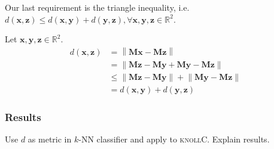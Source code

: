 \documentclass{article}
\newcommand{\vect}[1]{\ensuremath{\boldsymbol{\mathbf{#1}}}\xspace}
\begin{document}
Our last requirement is the triangle inequality, i.e.\ $d(\vect{x},\vect{z}) \leq d(\vect{x},\vect{y}) + d(\vect{y},\vect{z}), \forall \vect{x},\vect{y},\vect{z}\in \mathbb{R}^2$.

Let $\vect{x},\vect{y},\vect{z}\in\mathbb{R}^2$.
\begin{align}
  d(\vect{x},\vect{z}) &= \left\|\vect{M}\vect{x} - \vect{M}\vect{z}\right\|\\
  &= \left\|\vect{M}\vect{z} - \vect{M}\vect{y} + \vect{M}\vect{y} - \vect{M}\vect{z}\right\|\\
  &\leq \left\|\vect{M}\vect{z} - \vect{M}\vect{y}\right\| + \left\|\vect{M}\vect{y} - \vect{M}\vect{z}\right\|\\
  &= d(\vect{x},\vect{y}) + d(\vect{y},\vect{z})
\end{align}

\subsubsection{Results}
Use $d$ as metric in $k$-NN classifier and apply to
\textsc{knollC}. Explain results.
\end{document}
